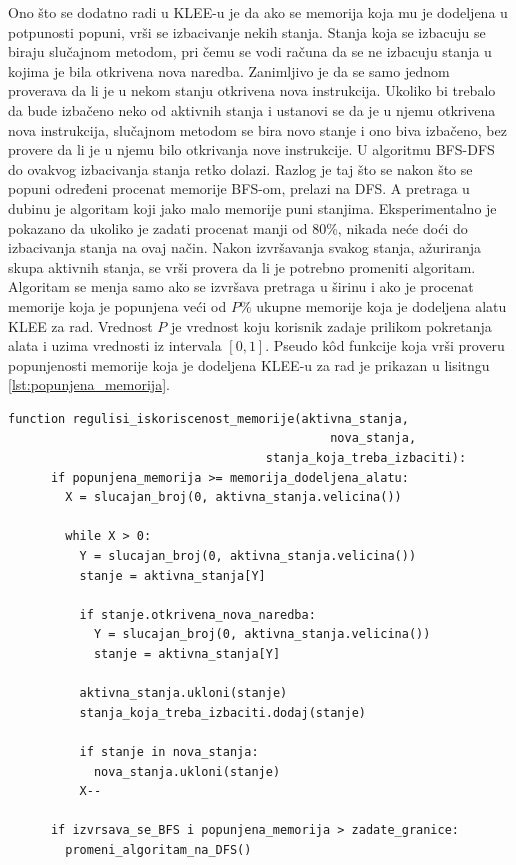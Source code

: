 \documentclass[12pt,oneside]{memoir}
\begin{document}
Ono što se dodatno radi u KLEE-u je da ako se memorija koja mu je dodeljena u potpunosti popuni, vrši se izbacivanje nekih stanja. Stanja koja se izbacuju se biraju slučajnom metodom, pri čemu se vodi računa da se ne izbacuju stanja u kojima je bila otkrivena nova naredba. Zanimljivo je da se samo jednom proverava da li je u nekom stanju otkrivena nova instrukcija. Ukoliko bi trebalo da bude izbačeno neko od aktivnih stanja i ustanovi se da je u njemu otkrivena nova instrukcija, slučajnom metodom se bira novo stanje i ono biva izbačeno, bez provere da li je u njemu bilo otkrivanja nove instrukcije. U algoritmu BFS-DFS do ovakvog izbacivanja stanja retko dolazi. Razlog je taj što se nakon  što se popuni određeni procenat memorije BFS-om, prelazi na DFS. A pretraga u dubinu je algoritam koji jako malo memorije puni stanjima. Eksperimentalno je pokazano da ukoliko je zadati procenat manji od 80\%, nikada neće doći do izbacivanja stanja na ovaj način. Nakon izvršavanja svakog stanja, ažuriranja skupa aktivnih stanja, se vrši provera da li je potrebno promeniti algoritam. Algoritam se menja samo ako se izvršava pretraga u širinu i ako je procenat memorije koja je popunjena veći od $P\%$ ukupne memorije koja je dodeljena alatu KLEE za rad. Vrednost $P$ je vrednost koju korisnik zadaje prilikom pokretanja alata i uzima vrednosti iz intervala $[0, 1]$. Pseudo k\^od funkcije koja vrši proveru popunjenosti memorije koja je dodeljena KLEE-u za rad je prikazan u lisitngu \ref{lst:popunjena_memorija}.

\begin{lstlisting}[caption={Pseudokod funkcije koja proverava koliko je memorije popunjeno},captionpos=b,label={lst:popunjena_memorija}]
    function regulisi_iskoriscenost_memorije(aktivna_stanja, 
                                             nova_stanja,
                                    stanja_koja_treba_izbaciti):
      if popunjena_memorija >= memorija_dodeljena_alatu:
        X = slucajan_broj(0, aktivna_stanja.velicina())

        while X > 0:
          Y = slucajan_broj(0, aktivna_stanja.velicina())
          stanje = aktivna_stanja[Y]
          
          if stanje.otkrivena_nova_naredba:
            Y = slucajan_broj(0, aktivna_stanja.velicina())
            stanje = aktivna_stanja[Y]

          aktivna_stanja.ukloni(stanje)
          stanja_koja_treba_izbaciti.dodaj(stanje)
          
          if stanje in nova_stanja:
            nova_stanja.ukloni(stanje)
          X--
          
      if izvrsava_se_BFS i popunjena_memorija > zadate_granice:
        promeni_algoritam_na_DFS()
    \end{lstlisting}
\end{document}
